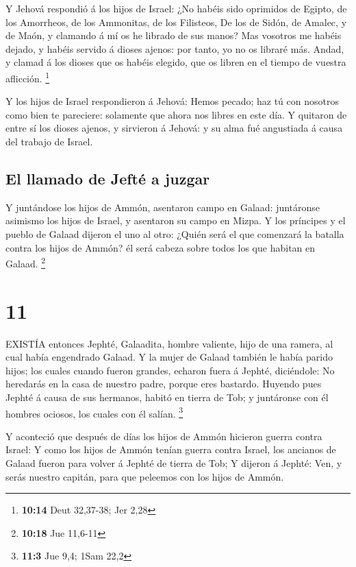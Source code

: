  Y Jehová respondió á los hijos de Israel: ¿No habéis sido
oprimidos de Egipto, de los Amorrheos, de los Ammonitas, de los
Filisteos,  De los de Sidón, de Amalec, y de Maón, y
clamando á mí os he librado de sus manos?  Mas vosotros me
habéis dejado, y habéis servido á dioses ajenos: por tanto, yo no os
libraré más.  Andad, y clamad á los dioses que os habéis
elegido, que os libren en el tiempo de vuestra aflicción. \footnote{\textbf{10:14}
  Deut 32,37-38; Jer 2,28}

 Y los hijos de Israel respondieron á Jehová: Hemos pecado;
haz tú con nosotros como bien te pareciere: solamente que ahora nos
libres en este día.  Y quitaron de entre sí los dioses
ajenos, y sirvieron á Jehová: y su alma fué angustiada á causa del
trabajo de Israel.

\hypertarget{el-llamado-de-jeftuxe9-a-juzgar}{%
\subsection{El llamado de Jefté a
juzgar}\label{el-llamado-de-jeftuxe9-a-juzgar}}

 Y juntándose los hijos de Ammón, asentaron campo en
Galaad: juntáronse asimismo los hijos de Israel, y asentaron su campo en
Mizpa.  Y los príncipes y el pueblo de Galaad dijeron el
uno al otro: ¿Quién será el que comenzará la batalla contra los hijos de
Ammón? él será cabeza sobre todos los que habitan en Galaad. \footnote{\textbf{10:18}
  Jue 11,6-11}

\hypertarget{section-10}{%
\section{11}\label{section-10}}

 EXISTÍA entonces Jephté, Galaadita, hombre valiente, hijo
de una ramera, al cual había engendrado Galaad.  Y la mujer
de Galaad también le había parido hijos; los cuales cuando fueron
grandes, echaron fuera á Jephté, diciéndole: No heredarás en la casa de
nuestro padre, porque eres bastardo.  Huyendo pues Jephté á
causa de sus hermanos, habitó en tierra de Tob; y juntáronse con él
hombres ociosos, los cuales con él salían. \footnote{\textbf{11:3} Jue
  9,4; 1Sam 22,2}

 Y aconteció que después de días los hijos de Ammón hicieron
guerra contra Israel:  Y como los hijos de Ammón tenían
guerra contra Israel, los ancianos de Galaad fueron para volver á Jephté
de tierra de Tob;  Y dijeron á Jephté: Ven, y serás nuestro
capitán, para que peleemos con los hijos de Ammón.

